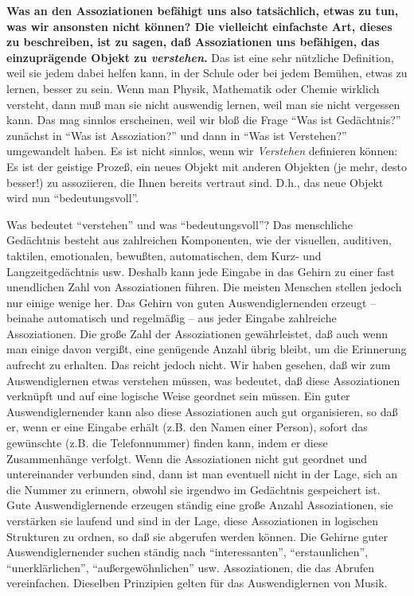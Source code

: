 \textbf{Was an den Assoziationen befähigt uns also tatsächlich, etwas zu tun, was wir ansonsten nicht können?
Die vielleicht einfachste Art, dieses zu beschreiben, ist zu sagen, daß Assoziationen uns befähigen, das einzuprägende Objekt zu \textit{verstehen}.}
Das ist eine sehr nützliche Definition, weil sie jedem dabei helfen kann, in der Schule oder bei jedem Bemühen, etwas zu lernen, besser zu sein.
Wenn man Physik, Mathematik oder Chemie wirklich versteht, dann muß man sie nicht auswendig lernen, weil man sie nicht vergessen kann.
Das mag sinnlos erscheinen, weil wir bloß die Frage \enquote{Was ist Gedächtnis?} zunächst in \enquote{Was ist Assoziation?} und dann in \enquote{Was ist Verstehen?} umgewandelt haben.
Es ist nicht sinnlos, wenn wir \textit{Verstehen} definieren können: Es ist der geistige Prozeß, ein neues Objekt mit anderen Objekten (je mehr, desto besser!) zu assoziieren, die Ihnen bereits vertraut sind.
D.h., das neue Objekt wird nun \enquote{bedeutungsvoll}.

Was bedeutet \enquote{verstehen} und was \enquote{bedeutungsvoll}?
Das menschliche Gedächtnis besteht aus zahlreichen Komponenten, wie der visuellen, auditiven, taktilen, emotionalen, bewußten, automatischen, dem Kurz- und Langzeitgedächtnis usw.
Deshalb kann jede Eingabe in das Gehirn zu einer fast unendlichen Zahl von Assoziationen führen.
Die meisten Menschen stellen jedoch nur einige wenige her.
Das Gehirn von guten Auswendiglernenden erzeugt -- beinahe automatisch und regelmäßig -- aus jeder Eingabe zahlreiche Assoziationen.
Die große Zahl der Assoziationen gewährleistet, daß auch wenn man einige davon vergißt, eine genügende Anzahl übrig bleibt, um die Erinnerung aufrecht zu erhalten.
Das reicht jedoch nicht.
Wir haben gesehen, daß wir zum Auswendiglernen etwas verstehen müssen, was bedeutet, daß diese Assoziationen verknüpft und auf eine logische Weise geordnet sein müssen.
Ein guter Auswendiglernender kann also diese Assoziationen auch gut organisieren, so daß er, wenn er eine Eingabe erhält (z.B. den Namen einer Person), sofort das gewünschte (z.B. die Telefonnummer) finden kann, indem er diese Zusammenhänge verfolgt.
Wenn die Assoziationen nicht gut geordnet und untereinander verbunden sind, dann ist man eventuell nicht in der Lage, sich an die Nummer zu erinnern, obwohl sie irgendwo im Gedächtnis gespeichert ist.
Gute Auswendiglernende erzeugen ständig eine große Anzahl Assoziationen, sie verstärken sie laufend und sind in der Lage, diese Assoziationen in logischen Strukturen zu ordnen, so daß sie abgerufen werden können.
Die Gehirne guter Auswendiglernender suchen ständig nach \enquote{interessanten}, \enquote{erstaunlichen}, \enquote{unerklärlichen}, \enquote{außergewöhnlichen} usw. Assoziationen, die das Abrufen vereinfachen.
Dieselben Prinzipien gelten für das Auswendiglernen von Musik.

